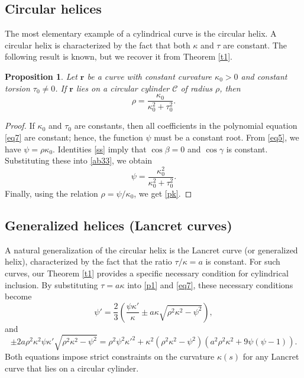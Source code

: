 \documentclass[a4paper,12pt]{amsart}
\theoremstyle{plain}
\newtheorem{proposition}[theorem]{Proposition}
\theoremstyle{definition}
\begin{document}
\subsection{Circular helices}
The most elementary example of a cylindrical curve is the circular helix.  A circular helix is characterized by the fact that both $\kappa$ and $\tau$ are constant. The following result is known, but we recover it from Theorem \ref{t1}.

\begin{proposition}\label{prop3.1}
Let $\mathbf{r}$ be a curve with constant curvature $\kappa_0 > 0$ and constant torsion $\tau_0\not=0$. If $\mathbf{r}$ lies on a circular cylinder $\mathcal{C}$ of radius $\rho$, then   
\begin{equation}\label{pk}
\rho = \frac{\kappa_0}{\kappa_0^2 + \tau_0^2}.
\end{equation}
\end{proposition}

\begin{proof}
If $\kappa_0$ and $\tau_0$ are constants, then all coefficients in the polynomial equation \eqref{eq7} are constant; hence, the function $\psi$ must be a constant root. From    \eqref{eq5}, we have $\psi = \rho\kappa_0$. Identities \eqref{ss} imply that $\cos\beta=0$ and $\cos\gamma$ is constant. Substituting these  into   \eqref{ab33}, we obtain
 $$\psi = \frac{\kappa_0^2}{\kappa_0^2 + \tau_0^2}.$$
  Finally, using the relation $\rho = \psi/\kappa_0$, we get \eqref{pk}. 
\end{proof}


\subsection{Generalized helices (Lancret curves)}
A natural generalization of the circular helix is the Lancret curve (or generalized helix), characterized by the fact that the ratio $\tau/\kappa = a$ is constant. For such curves, our Theorem \ref{t1} provides a specific necessary condition for cylindrical inclusion. By substituting $\tau = a\kappa$ into \eqref{p1} and \eqref{eq7}, these  necessary conditions become  
\begin{equation}\label{l1}
\psi'=\frac{2}{3} \left(\frac{\psi  \kappa '}{\kappa }\pm a\kappa \sqrt{\rho ^2 \kappa ^2-\psi ^2}\right),
\end{equation}
and
\begin{equation}\label{l2}
\pm 2 a \rho^2 \kappa^2 \psi \kappa'\sqrt{\rho^2 \kappa^2 - \psi^2} =  \rho^2 \psi^2 \kappa'^2 + \kappa^2 (\rho^2 \kappa^2 - \psi^2) (a^2 \rho^2 \kappa^2 + 9 \psi (\psi - 1)).
\end{equation}
Both equations  impose   strict constraints on the       curvature $\kappa(s)$ for any Lancret curve   that lies on a circular cylinder.
\end{document}
